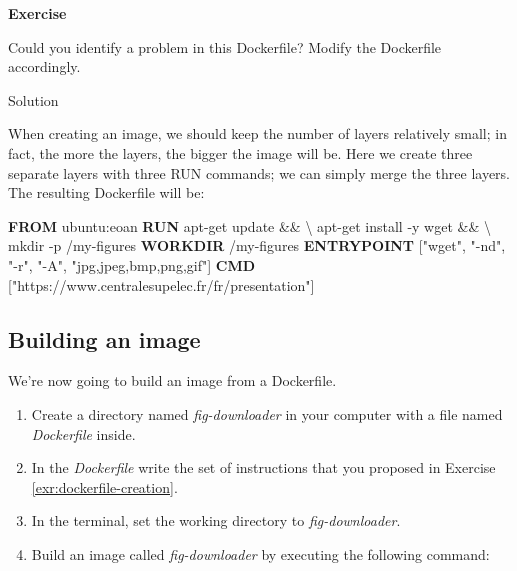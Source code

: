 \documentclass[
]{article}
\newenvironment{Shaded}{\begin{snugshade}}{\end{snugshade}}
\newcommand{\KeywordTok}[1]{\textcolor[rgb]{0.13,0.29,0.53}{\textbf{#1}}}
\newcommand{\NormalTok}[1]{#1}
\newcommand{\StringTok}[1]{\textcolor[rgb]{0.31,0.60,0.02}{#1}}
\newenvironment{infobox}[1]
  {
  \begin{itemize}
  \renewcommand{\labelitemi}{
    \raisebox{-.7\height}[0pt][0pt]{
      
    }
  }
  \setlength{\fboxsep}{1em}
  \begin{whitebox}
  \item
  }
  {
  \end{whitebox}
  \end{itemize}
  }
\theoremstyle{definition}
\theoremstyle{definition}
\theoremstyle{definition}
\theoremstyle{remark}
\let\BeginKnitrBlock\begin \let\EndKnitrBlock\end
\begin{document}
\begin{infobox}{exercisebox}

\textbf{Exercise}

\BeginKnitrBlock{exercise}
\protect\hypertarget{exr:dockerfile-creation}{}{\label{exr:dockerfile-creation} }Could you identify a problem in this Dockerfile?
Modify the Dockerfile accordingly.
\EndKnitrBlock{exercise}

\end{infobox}

Solution

\begin{infobox}{exercisebox}

When creating an image, we should keep the number of layers relatively
small; in fact, the more the layers, the bigger the image will be.
Here we create three separate layers with three RUN commands; we can
simply merge the three layers.
The resulting Dockerfile will be:

\begin{Shaded}
\begin{Highlighting}[]
\KeywordTok{FROM}\NormalTok{ ubuntu:eoan}
\KeywordTok{RUN}\NormalTok{ apt{-}get update \&\& \textbackslash{}}
\NormalTok{    apt{-}get install {-}y wget \&\& \textbackslash{}}
\NormalTok{    mkdir {-}p /my{-}figures}
\KeywordTok{WORKDIR}\NormalTok{ /my{-}figures}
\KeywordTok{ENTRYPOINT}\NormalTok{ [}\StringTok{"wget"}\NormalTok{, }\StringTok{"{-}nd"}\NormalTok{, }\StringTok{"{-}r"}\NormalTok{, }\StringTok{"{-}A"}\NormalTok{, }\StringTok{"jpg,jpeg,bmp,png,gif"}\NormalTok{]}
\KeywordTok{CMD}\NormalTok{ [}\StringTok{"https://www.centralesupelec.fr/fr/presentation"}\NormalTok{]}
\end{Highlighting}
\end{Shaded}

\end{infobox}

\hypertarget{building-an-image}{%
\subsection{Building an image}\label{building-an-image}}

We're now going to build an image from a Dockerfile.

\begin{enumerate}
\def\labelenumi{\arabic{enumi}.}
\item
  Create a directory named \emph{fig-downloader} in your computer with
  a file named \emph{Dockerfile} inside.
\item
  In the \emph{Dockerfile} write the set of instructions that
  you proposed in Exercise \ref{exr:dockerfile-creation}.
\item
  In the terminal, set the working directory to \emph{fig-downloader}.
\item
  Build an image called \emph{fig-downloader} by executing the following command:
\end{enumerate}
\end{document}

